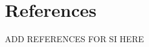 \documentclass[utf8]{frontiers_suppmat} %
\newlength{\cslhangindent}
\newlength{\cslentryspacingunit} %
\newenvironment{CSLReferences}[2] %
 {%
  \setlength{\parindent}{0pt}
  \ifodd #1
  \let\oldpar\par
  \def\par{\hangindent=\cslhangindent\oldpar}
  \fi
  \setlength{\parskip}{#2\cslentryspacingunit}
 }%
 {}
\begin{document}
\hypertarget{sec:references}{%
%
\section*{References}\label{sec:references}}

\begingroup
\setlength{\parindent}{-0.5in}
\setlength{\leftskip}{0.5in}

\hypertarget{refs}{}
\begin{CSLReferences}{1}{0}

ADD REFERENCES FOR SI HERE

\end{CSLReferences}

\endgroup
\end{document}
